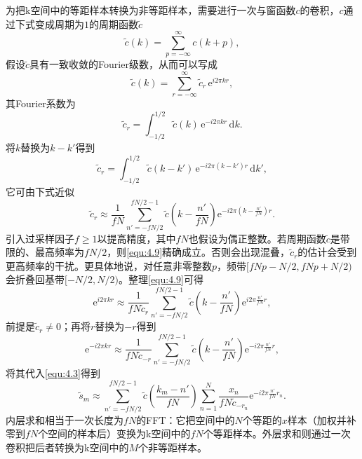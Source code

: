 \documentclass[12pt]{article}
\let\originallautoref\autoref
\renewcommand{\autoref}[1]{\allowbreak\originallautoref{#1}}
\begin{document}
为把k空间中的等距样本转换为非等距样本，需要进行一次与窗函数$c$的卷积，$c$通过下式变成周期为$1$的周期函数$\tilde{c}$
\begin{equation}
    \tilde{c}(k)=\sum_{p=-\infty}^{\infty}c(k+p),
    \label{equ:4.5}
\end{equation}
假设$\tilde{c}$具有一致收敛的Fourier级数，从而可以写成
\begin{equation}
    \tilde{c}(k)=\sum_{r=-\infty}^{\infty}\tilde{c}_r\,\mathrm{e}^{i2\pi kr},
    \label{equ:4.6}
\end{equation}
其Fourier系数为
\begin{equation}
    \tilde{c}_r=\int_{-1/2}^{1/2}\tilde{c}(k)\,\mathrm{e}^{-i2\pi kr}\,\mathrm{d}k.
    \label{equ:4.7}
\end{equation}
将$k$替换为$k-k'$得到
\begin{equation}
    \tilde{c}_r=\int_{-1/2}^{1/2}\tilde{c}(k-k')\,\mathrm{e}^{-i2\pi(k-k')r}\,\mathrm{d}k',
    \label{equ:4.8}
\end{equation}
它可由下式近似
\begin{equation}
    \tilde{c}_r\approx\frac{1}{fN}\sum_{n'=-fN/2}^{fN/2-1}\tilde{c}\left(k-\frac{n'}{fN}\right)\mathrm{e}^{-i2\pi\left(k-\frac{n'}{fN}\right)r}.
    \label{equ:4.9}
\end{equation}
引入过采样因子$f\ge 1$以提高精度，其中$fN$也假设为偶正整数。若周期函数$\tilde{c}$是带限的、最高频率为$fN/2$，则\autoref{equ:4.9}精确成立。否则会出现混叠，$\tilde{c}_r$的估计会受到更高频率的干扰。更具体地说，对任意非零整数$p$，频带$[fNp-N/2,fNp+N/2)$会折叠回基带$[-N/2,N/2)$。整理\autoref{equ:4.9}可得
\begin{equation}
    \mathrm{e}^{i2\pi kr}\approx\frac{1}{fN\tilde{c}_r}\sum_{n'=-fN/2}^{fN/2-1}\tilde{c}\left(k-\frac{n'}{fN}\right)\mathrm{e}^{i2\pi\frac{n'}{fN}r},
    \label{equ:4.10}
\end{equation}
前提是$\tilde{c}_r\neq 0$；再将$r$替换为$-r$得到
\begin{equation}
    \mathrm{e}^{-i2\pi kr}\approx\frac{1}{fN\tilde{c}_{-r}}\sum_{n'=-fN/2}^{fN/2-1}\tilde{c}\left(k-\frac{n'}{fN}\right)\mathrm{e}^{-i2\pi\frac{n'}{fN}r},
    \label{equ:4.11}
\end{equation}
将其代入\autoref{equ:4.3}得到
\begin{equation}
    \tilde{s}_m\approx\sum_{n'=-fN/2}^{fN/2-1}\tilde{c}\left(\frac{k_m-n'}{fN}\right)\sum_{n=1}^{N}\frac{x_n}{fN\tilde{c}_{-r_n}}\mathrm{e}^{-i2\pi\frac{n'}{fN}r_n}.
    \label{equ:4.12}
\end{equation}
内层求和相当于一次长度为$fN$的FFT：它把空间中的$N$个等距的$x$样本（加权并补零到$fN$个空间的样本后）变换为k空间中的$fN$个等距样本。外层求和则通过一次卷积把后者转换为k空间中的$M$个非等距样本。
\end{document}

